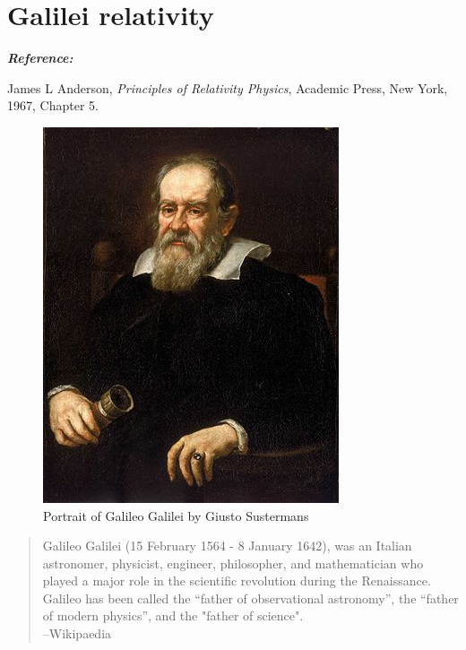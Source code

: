 \chapter{Galilei relativity}


{\bf{\textit{Reference:}}}

James L Anderson, \textsl{Principles of Relativity
Physics}, Academic Press, New York, 1967, Chapter 5.
\thispagestyle{empty}
\newpage

\thispagestyle{empty}
\begin{figure}[H]
\centering
\includegraphics[scale=3]{src/images/lbk-graphics/portraits/galileo-wiki.jpg}
\caption*{Portrait of Galileo Galilei by Giusto Sustermans}
\end{figure}

\begin{small}
\begin{quote}
Galileo Galilei (15 February 1564 - 8 January 1642),
was an Italian astronomer, physicist, engineer,
philosopher, and mathematician who played a major role
in the scientific revolution during the Renaissance.
Galileo has been called the ``father of observational
astronomy'', the ``father of modern physics'', and the 
"father of science". \\\dm \hfill --Wikipaedia
\end{quote}
\end{small}

